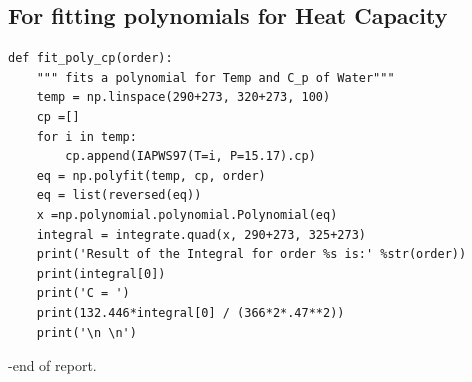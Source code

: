 \documentclass[12pt,letterpaper]{article}
\begin{document}
\begin{appendices}

\section{For fitting polynomials for Heat Capacity}

\begin{verbatim}
def fit_poly_cp(order):
    """ fits a polynomial for Temp and C_p of Water"""
    temp = np.linspace(290+273, 320+273, 100)
    cp =[]
    for i in temp:
        cp.append(IAPWS97(T=i, P=15.17).cp)
    eq = np.polyfit(temp, cp, order)
    eq = list(reversed(eq))
    x =np.polynomial.polynomial.Polynomial(eq)
    integral = integrate.quad(x, 290+273, 325+273)
    print('Result of the Integral for order %s is:' %str(order))
    print(integral[0])
    print('C = ')
    print(132.446*integral[0] / (366*2*.47**2))
    print('\n \n')
\end{verbatim}


\end{appendices}
\pagebreak

-end of report.
\end{document}
